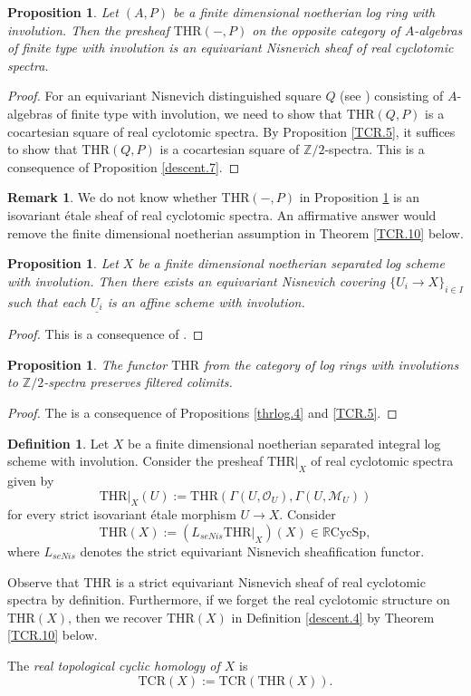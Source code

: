 \documentclass[10pt]{amsart}
\newtheorem{prop}[thm]{Proposition}
\theoremstyle{definition}
\newtheorem{df}[thm]{Definition}
\newtheorem{rmk}[thm]{Remark}
\theoremstyle{remark}
\numberwithin{equation}{section}
\newcommand{\Z}{\mathbb{Z}}
\newcommand{\cM}{\mathcal{M}}
\newcommand{\cO}{\mathcal{O}}
\newcommand{\ul}{\underline}
\newcommand{\RCycSp}{\mathbb{R}\mathrm{CycSp}}
\newcommand{\THR}{\mathrm{THR}}
\newcommand{\TCR}{\mathrm{TCR}}
\begin{document}
\begin{prop}
\label{TCR.7}
Let $(A,P)$ be a finite dimensional noetherian log ring with involution.
Then the presheaf $\THR(-,P)$ on the opposite category of $A$-algebras of finite type with involution is an equivariant Nisnevich sheaf of real cyclotomic spectra.
\end{prop}
\begin{proof}
For an equivariant Nisnevich distinguished square $Q$ (see \cite[\S 2.1]{HeKO}) consisting of $A$-algebras of finite type with involution, we need to show that $\THR(Q,P)$ is a cocartesian square of real cyclotomic spectra.
By Proposition \ref{TCR.5},
it suffices to show that $\THR(Q,P)$ is a cocartesian square of $\Z/2$-spectra.
This is a consequence of Proposition \ref{descent.7}.
\end{proof}

\begin{rmk}
We do not know whether $\THR(-,P)$ in Proposition \ref{TCR.7} is an isovariant \'etale sheaf of real cyclotomic spectra.
An affirmative answer would remove the finite dimensional noetherian assumption in Theorem \ref{TCR.10} below.
\end{rmk}



\begin{prop}
\label{TCR.8}
Let $X$ be a finite dimensional noetherian separated log scheme with involution.
Then there exists an equivariant Nisnevich covering $\{U_i\to X\}_{i\in I}$ such that each $\ul{U_i}$ is an affine scheme with involution.
\end{prop}
\begin{proof}
This is a consequence of \cite[Lemma 2.20]{HeKO}.
\end{proof}

\begin{prop}
\label{TCR.11}
The functor $\THR$ from the category of log rings with involutions to $\Z/2$-spectra preserves filtered colimits.
\end{prop}
\begin{proof}
The is a consequence of Propositions \ref{thrlog.4} and \ref{TCR.5}.
\end{proof}

\begin{df}
\label{TCR.9}
Let $X$ be a finite dimensional noetherian separated integral log scheme with involution.
Consider the presheaf $\THR|_X$ of real cyclotomic spectra
given by
\[
\THR|_X(U)
:=\THR(\Gamma(U,\cO_U),\Gamma(U,\cM_U))
\]
for every strict isovariant \'etale morphism $U\to X$.
Consider
\[
\THR(X)
:=
(L_{seNis} \THR|_X)(X)\in \RCycSp,
\]
where $L_{seNis}$ denotes the strict equivariant Nisnevich sheafification functor.

Observe that $\THR$ is a strict equivariant Nisnevich sheaf of real cyclotomic spectra by definition.
Furthermore,
if we forget the real cyclotomic structure on $\THR(X)$,
then we recover $\THR(X)$ in Definition \ref{descent.4} by Theorem \ref{TCR.10} below.

The \emph{real topological cyclic homology of $X$} is
\[
\TCR(X):=\TCR(\THR(X)).
\]
\end{df}
\end{document}
